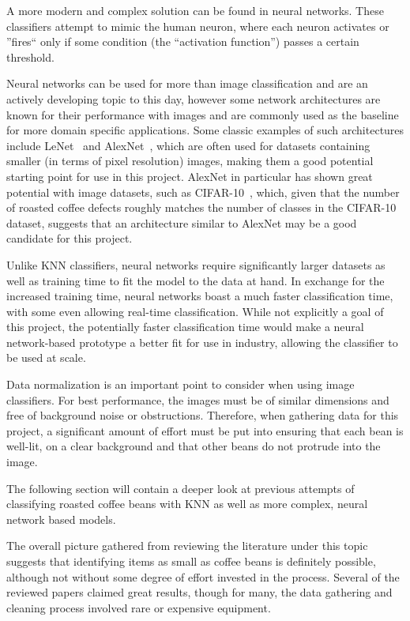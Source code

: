 A more modern and complex solution can be found in neural networks. %
These classifiers
attempt to mimic the human neuron, where each neuron activates or ''fires`` only
if some condition (the ``activation function'') passes a certain threshold.

Neural networks can be used for more than image classification and are an
actively developing topic to this day, however some network architectures are known
for their performance with images and are commonly used as the baseline for more
domain specific applications.
Some classic examples of such architectures include LeNet~\cite{leNetOverview}
and AlexNet~\cite{alexNetOverview}, which are often used for datasets containing
smaller (in terms of pixel resolution) images, making them a good potential
starting point for use in this project.
AlexNet in particular has shown great potential
with image datasets, such as CIFAR-10~\cite{cifar10}, which, given that the
number of roasted coffee defects roughly matches the number of classes in the
CIFAR-10 dataset, suggests that an architecture similar to AlexNet may be a good
candidate for this project.

Unlike KNN classifiers, neural networks require significantly larger datasets as
well as training time to fit the model to the data at hand.
In exchange for the increased
training time, neural networks boast a much faster classification time, with some
even allowing real-time classification.
While not explicitly a goal of this
project, the potentially faster classification time would make a neural network-based
prototype a better fit for use in industry, allowing the classifier to be used
at scale. %

Data normalization is an important point to consider when using image
classifiers.
For best performance, the images must be of similar dimensions and
free of background noise or obstructions.
Therefore, when gathering data for
this project, a significant amount of effort must be put into ensuring that each
bean is well-lit, on a clear background and that other beans do not protrude
into the image.

The following section will contain a deeper look at previous attempts of
classifying roasted coffee beans with KNN as well as more complex, neural network
based models.

The overall picture gathered from reviewing the literature
under this topic suggests that identifying items as small as coffee beans is definitely
possible, although not without some degree of effort invested in the process.
Several
of the reviewed papers claimed great results, though for many, the data gathering
and cleaning process involved rare or expensive equipment.

